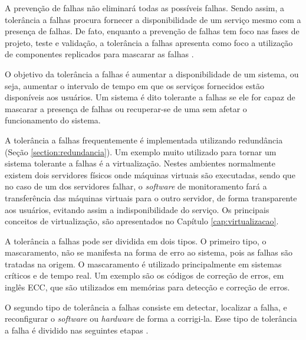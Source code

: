 A prevenção de falhas não eliminará todas as possíveis falhas. Sendo assim, a tolerância a falhas procura fornecer a disponibilidade de 
um serviço mesmo com a presença de falhas. De fato, enquanto a prevenção de falhas tem foco nas fases de projeto, teste e validação, a 
tolerância a falhas apresenta como foco a utilização de componentes replicados para mascarar as falhas \cite{pankaj1994}.

O objetivo da tolerância a falhas é aumentar a disponibilidade de um sistema, ou seja, aumentar o intervalo de tempo em que os serviços 
fornecidos estão disponíveis aos usuários. Um sistema é dito tolerante a falhas se ele for capaz de mascarar a presença de falhas ou recuperar-se 
de uma sem afetar o funcionamento do sistema.

A tolerância a falhas frequentemente é implementada utilizando redundância (Seção \ref{section:redundancia}). 
Um exemplo muito utilizado para tornar um sistema tolerante a falhas é a virtualização. Nestes ambientes normalmente existem dois servidores 
físicos onde máquinas virtuais são executadas, sendo que no caso de um dos servidores falhar, o \textit{software} de monitoramento fará a 
transferência das máquinas virtuais para o outro servidor, de forma transparente aos usuários, evitando assim a indisponibilidade do serviço. 
Os principais conceitos de virtualização, são apresentados no Capítulo \ref{cap:virtualizacao}.

A tolerância a falhas pode ser dividida em dois tipos. O primeiro tipo, o mascaramento, não se manifesta na forma de erro ao sistema, 
pois as falhas são tratadas na origem. O mascaramento é utilizado principalmente em sistemas críticos e de tempo real. Um exemplo são os 
códigos de correção de erros, em inglês \ac{ECC}, que são utilizados em memórias para detecção e correção de erros.

O segundo tipo de tolerância a falhas consiste em detectar, localizar a falha, e reconfigurar o \textit{software} ou \textit{hardware} de 
forma a corrigi-la. Esse tipo de tolerância a falha é dividido nas seguintes etapas \cite{weber2002}. 

